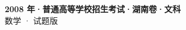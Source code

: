 \documentclass[zihao=-4, a4paper]{ctexart}
\begin{document}
\begin{center}
  {\Large\bfseries 2008 年·普通高等学校招生考试·湖南卷·文科}\\[4pt]
  {\large 数学 · 试题版}
\end{center}
\medskip
{}

\end{document}
